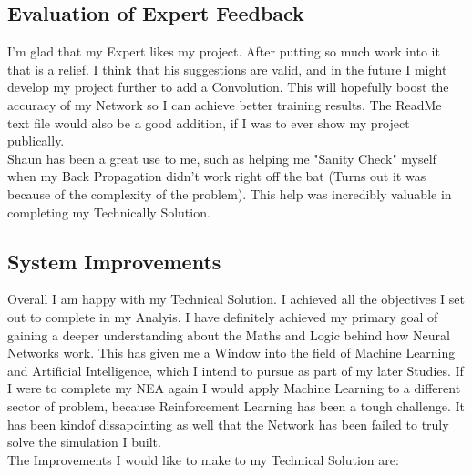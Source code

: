 \begin{flushleft}
\begin{enumerate}
                \vspace{0.5cm}
        \end{enumerate}

        \vspace{0.5cm}
    \subsection{Evaluation of Expert Feedback}
        \vspace{0.2cm}
        I'm glad that my Expert likes my project. After putting so much work into it that is a relief. I think that his suggestions are valid, and
        in the future I might develop my project further to add a Convolution. This will hopefully boost the accuracy of my Network so I can achieve
        better training results. The ReadMe text file would also be a good addition, if I was to ever show my project publically. \\
        \vspace{0.2cm}
        Shaun has been a great use to me, such as helping me "Sanity Check" myself when my Back Propagation didn't work right off the bat (Turns out
        it was because of the complexity of the problem). This help was incredibly valuable in completing my Technically Solution. \\
        \vspace{0.5cm}
    \subsection{System Improvements}
        \vspace{0.2cm}
        Overall I am happy with my Technical Solution. I achieved all the objectives I set out to complete in my Analyis. I have definitely achieved
        my primary goal of gaining a deeper understanding about the Maths and Logic behind how Neural Networks work. This has given me a Window into
        the field of Machine Learning and Artificial Intelligence, which I intend to pursue as part of my later Studies. If I were to complete my NEA
        again I would apply Machine Learning to a different sector of problem, because Reinforcement Learning has been a tough challenge. It has been
        kindof dissapointing as well that the Network has been failed to truly solve the simulation I built. \\
        \vspace{0.2cm}
        The Improvements I would like to make to my Technical Solution are: \\
        \vspace{0.5cm}


\end{flushleft}
